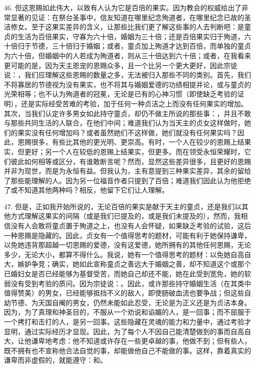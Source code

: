 46. 但这恩赐如此伟大，以致有人认为它是百倍的果实。因为教会的权威给出了非常显著的见证：在祭台圣事中，信友知道在哪里纪念殉道者，在哪里纪念已故的圣洁修女。至于这果实差异的含义，让那些比我们更了解这些事的人去判断吧：是童贞的生活为百倍果实，守寡为六十倍，婚姻为三十倍；还是百倍果实归于殉道，六十倍归于节德，三十倍归于婚姻；或者，童贞加上殉道才达到百倍，而单独的童贞为六十倍，但婚姻中的人若成为殉道者，则从三十倍达到六十倍；或者，在我看来更可能的是，因为天主恩宠的恩赐众多，且一个比另一个更大更好，因此宗徒说：，我们应理解这些恩赐的数量之多，无法被归入那些不同的类别。首先，我们不将寡居的节德视为没有果实，也不将其与婚姻爱德的功绩相提并论，或与童贞的光荣相等；也不认为殉道者的冠冕，无论是已有的心神习惯（即使缺乏考验的证明），还是实际经受苦难的考验，加于任何一种贞洁之上而没有任何果实的增加。其次，当我们认定许多男女如此持守童贞，却仍不做主所说的那些事：，并且不敢与那些共同生活的人联合，在他们中间；难道我们认为当天主的贞女这样做时，她们的果实没有任何增加吗？或者虽然她们不这样做，她们就没有任何果实吗？因此，恩赐很多，有些比其他的更光明、更崇高。有时，一个人在较少的恩赐上结果实，但更好；另一个人在较低的恩赐上结果实，但更多。而在领受永恒荣耀时，它们彼此如何相等或区分，有谁敢断言呢？然而，显然这些差异很多，且更好的恩赐并非为现世，而是为永恒有益。但我认为，主有意提到三种果实差异，其余的留给了那些能理解的人。因为另一位福音作者只提到了百倍；难道我们因此认为他拒绝了或不知道其他两种吗？相反，他留下它们让人理解。\par

47. 但是，正如我开始所说的，无论百倍的果实是献于天主的童贞，还是我们以其他方式理解这果实的间隔（或是我们已提及的，或是我们未提及的），然而，我相信没有人会敢将童贞置于殉道之上，也没有人会怀疑，如果缺乏考验的试验，这后一种恩赐是隐藏的。因此，贞女有一个值得思考的题材，可能有利于她保持谦卑，以免她违背那超越一切恩赐的爱德，没有这爱德，她所拥有的其他任何恩赐，无论多少，无论大小，都算不得什么。我说，她有一个值得思考的题材：以免她自高自大，嫉妒争竞；确实，她如此宣称童贞之善远大于婚姻之善，却不知道这个或那个已婚妇女是否已经能够为基督受苦，而她自己却还不能，她在此受到宽免，她的软弱没有受到考验的质问。因为宗徒说：。因此，或许那些持守婚姻生活（在其类中值得赞美）的男女，已经能够抵挡不义的敌人，即使肠破血流也要争战；但这些自幼节德、为天国自阉的男女，仍然未能如此忍受，无论是为正义还是为贞洁本身。因为，为了真理和神圣目的，不服从一个劝说和谄媚的人，是一回事；而不屈服于一个拷打和击打的人，是另一回事。这些隐藏在灵魂的能力和力量中，通过考验才显明，通过实际经历才显现。因此，为了每个人不因自己能清楚做到的事而自高自大，让他谦卑地考虑：他不知道或许存在一些更卓越的事，他做不到；但有些人，既不拥有也不宣称他合法自觉的事，却能做他自己不能做的事。这样，靠着真实的谦卑而非虚假的，就能遵守：和。\par

